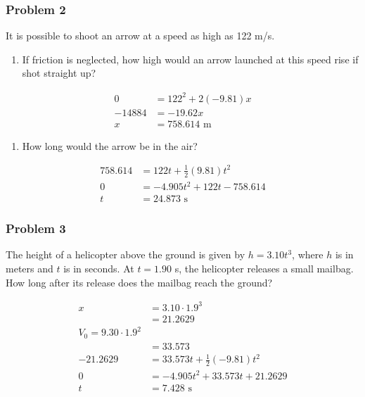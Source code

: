 \documentclass[
  letterpaper,
  DIV=11,
  numbers=noendperiod]{scrartcl}
\providecommand{\tightlist}{%
  \setlength{\itemsep}{0pt}\setlength{\parskip}{0pt}}\usepackage{longtable,booktabs,array}
\begin{document}
\hypertarget{problem-2-3}{%
\subsubsection{Problem 2}\label{problem-2-3}}

It is possible to shoot an arrow at a speed as high as 122 m/s.

\begin{enumerate}
\def\labelenumi{(\alph{enumi})}
\tightlist
\item
  If friction is neglected, how high would an arrow launched at this
  speed rise if shot straight up?
\end{enumerate}

\begin{align*}
0 &= 122^2 + 2(-9.81)x \\
-14884 &= -19.62x \\
x &= 758.614 \text{ m}
\end{align*}

\begin{enumerate}
\def\labelenumi{(\alph{enumi})}
\setcounter{enumi}{1}
\tightlist
\item
  How long would the arrow be in the air?
\end{enumerate}

\begin{align*}
758.614 &= 122t + \frac{1}{2}(9.81)t^2 \\
0 &= -4.905t^2 + 122t - 758.614 \\
t &= 24.873 \text{ s}
\end{align*}

\hypertarget{problem-3-3}{%
\subsubsection{Problem 3}\label{problem-3-3}}

The height of a helicopter above the ground is given by \(h = 3.10t^3\),
where \(h\) is in meters and \(t\) is in seconds. At \(t = 1.90\) s, the
helicopter releases a small mailbag. How long after its release does the
mailbag reach the ground?

\begin{align*}
x &= 3.10 \cdot 1.9^3 \\ 
&= 21.2629 \\
V_0 = 9.30 \cdot 1.9^2 \\
&= 33.573 \\
-21.2629 &= 33.573t + \frac{1}{2}(-9.81)t^2 \\
0 &= -4.905t^2 + 33.573t + 21.2629 \\
t &= 7.428 \text{ s}
\end{align*}
\end{document}
